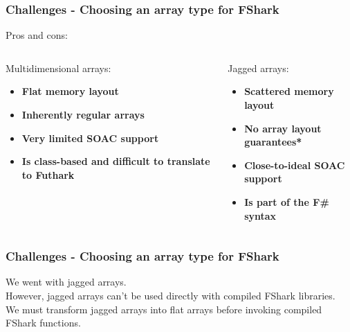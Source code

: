 \documentclass[10pt, compress, usenames, dvipsnames]{beamer}
\begin{document}
\begin{frame}[fragile]
  \frametitle{Challenges - Choosing an array type for FShark}
  Pros and cons:\\
  \begin{columns}
    \begin{column}{.48\textwidth}
      Multidimensional arrays:\\
      \begin{itemize}
      \item<1-> {\color{ForestGreen} \textbf{Flat memory layout}}
      \item<2-> {\color{ForestGreen} \textbf{Inherently regular arrays}}
      \item<3-> {\color{red} \textbf{Very limited SOAC support}}
      \item<4-> {\color{red} \textbf{Is class-based and difficult to translate
            to Futhark}}
      \end{itemize}
    \end{column}
    \begin{column}{.48\textwidth}
      Jagged arrays:\\
      \begin{itemize}
      \item<1-> {\color{red} \textbf{Scattered memory layout}}
      \item<2-> {\color{red} \textbf{No array layout guarantees*}} 
      \item<3-> {\color{ForestGreen} \textbf{Close-to-ideal SOAC support}}
      \item<4-> {\color{ForestGreen} \textbf{Is part of the F\# syntax}}
      \end{itemize}
    \end{column}
  \end{columns}
\end{frame}

\begin{frame}[fragile, c]
  \frametitle{Challenges - Choosing an array type for FShark}
  We went with jagged arrays.\\
  However, jagged arrays can't be used directly with compiled FShark libraries.\\
  \pause
  We must transform jagged arrays into flat arrays before invoking compiled
  FShark functions.
\end{frame}
\end{document}
